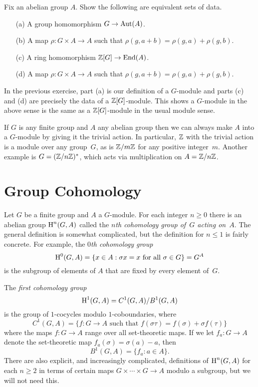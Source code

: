 \begin{exercise}
	Fix an abelian group $A$.
	Show the following are equivalent sets of data.
	\begin{enumerate}
		\item[(a)] A group homomorphism $G\to \operatorname{Aut}(A)$.
		\item[(b)] A map $\rho:G\times A \to A$ such that
			$\rho(g,a+b) = \rho(g,a) + \rho(g,b)$.
		\item[(c)] A ring homomorphism $\mathbb{Z}[G] \to \operatorname{End}(A)$.
		\item[(d)] A map $\rho:G\times A \to A$ such that
					$\rho(g,a+b) = \rho(g,a) + \rho(g,b)$.
	\end{enumerate}
\end{exercise}

\begin{remark}
	In the previous exercise, part (a) is our definition
	of a $G$-module and parts (c) and (d) are precisely
	the data of a $\mathbb{Z}[G]$-module. This shows a $G$-module
	in the above sense is the same as a $\mathbb{Z}[G]$-module
	in the usual module sense.
\end{remark}

\begin{example}
	If $G$ is any finite group and $A$ any abelian group
	then we can always make $A$ into a $G$-module by
	giving it the trivial action.
	In particular, $\mathbb{Z}$ with the trivial action is a
	module over any group~$G$, as is $\mathbb{Z}/m\mathbb{Z}$ for any positive
	integer~$m$. Another example is $G=(\mathbb{Z}/n\mathbb{Z})^*$, which acts
	via multiplication on $A = \mathbb{Z}/n\mathbb{Z}$.
\end{example}

\section{Group Cohomology}

Let $G$ be a finite group and $A$ a $G$-module.
For each integer $n\geq 0$ there is an abelian group $\operatorname{H}^n(G,A)$
called the {\em $n$th cohomology group of~$G$ acting on~$A$}.  The
general definition is somewhat complicated, but the definition for
$n\leq 1$ is fairly concrete.
For example, the {\em $0$th cohomology group}
$$
	\operatorname{H}^0(G,A) = \{x \in A : \sigma x = x \text{ for all } \sigma \in G\} = G^A
$$
is the subgroup of elements of $A$ that are fixed by every element
of~$G$.

The {\em first cohomology group}
$$
	\operatorname{H}^1(G,A) = C^1(G,A)/B^1(G,A)
$$
is the group of $1$-cocycles modulo $1$-coboundaries, where
$$
	C^1(G, A) = \{f : G \to A \text{ such that } f(\sigma\tau)
	= f(\sigma) + \sigma f(\tau)\}
$$
where the maps $f:G\to A$ range over all set-theoretic maps.
If we let $f_a: G \to A$ denote the set-theoretic map $f_a(\sigma) = \sigma(a)-a$,
then
$$
	B^1(G, A) = \{f_a :  a\in A\}.
$$
There are also explicit, and increasingly complicated, definitions of
$\operatorname{H}^n(G,A)$ for each $n\geq 2$ in terms of certain maps $G \times
\cdots \times G \to A$ modulo a subgroup, but we will not need this.

